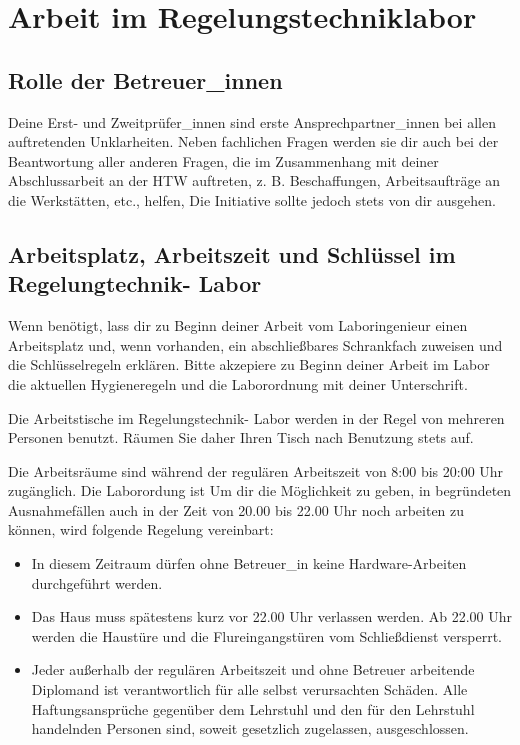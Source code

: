 \section{Arbeit im Regelungstechniklabor}

\subsection{Rolle der Betreuer\_innen}
Deine Erst- und Zweitprüfer\_innen sind erste Ansprechpartner\_innen bei allen auftretenden Unklarheiten. Neben fachlichen Fragen werden sie dir auch bei der Beantwortung aller anderen Fragen, die im Zusammenhang mit deiner Abschlussarbeit an der HTW auftreten, z. B. Beschaffungen, Arbeitsaufträge an die Werkstätten, etc., helfen,  Die Initiative sollte jedoch stets von dir ausgehen.


\subsection{Arbeitsplatz, Arbeitszeit und Schlüssel im Regelungtechnik- Labor}

Wenn benötigt, lass dir zu Beginn deiner Arbeit vom Laboringenieur einen Arbeitsplatz und, wenn vorhanden, ein abschließbares Schrankfach zuweisen und die Schlüsselregeln  erklären. Bitte akzepiere zu Beginn deiner Arbeit im Labor die aktuellen Hygieneregeln und die Laborordnung mit deiner Unterschrift.

Die Arbeitstische im Regelungstechnik- Labor werden in der Regel von mehreren Personen benutzt. Räumen Sie daher Ihren Tisch nach Benutzung stets auf.

Die Arbeitsräume sind während der regulären Arbeitszeit von 8:00 bis 20:00 Uhr zugänglich. Die Laborordung ist Um dir die Möglichkeit zu geben, in begründeten Ausnahmefällen auch in der Zeit von 20.00 bis 22.00 Uhr noch arbeiten zu können, wird folgende Regelung vereinbart:
\begin{itemize}
    \item In diesem Zeitraum dürfen ohne Betreuer\_in keine Hardware-Arbeiten durchgeführt werden.
    \item Das Haus muss spätestens kurz vor 22.00 Uhr verlassen werden. Ab 22.00 Uhr werden die Haustüre und die Flureingangstüren vom Schließdienst versperrt.
    \item Jeder außerhalb der regulären Arbeitszeit und ohne Betreuer arbeitende Diplomand ist verantwortlich für alle selbst verursachten Schäden. Alle Haftungsansprüche gegenüber dem  Lehrstuhl und den für den Lehrstuhl handelnden Personen sind, soweit gesetzlich zugelassen, ausgeschlossen.
\end{itemize}


